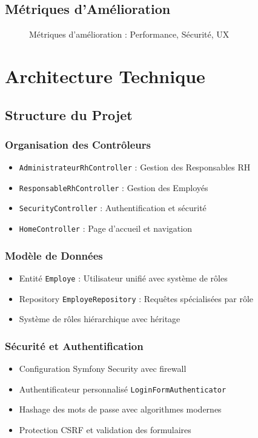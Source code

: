 \documentclass[12pt,a4paper]{article}
\begin{document}
\subsection{Métriques d'Amélioration}

\begin{figure}[H]
    \centering
    \caption{Métriques d'amélioration : Performance, Sécurité, UX}
    \label{fig:metriques_amelioration}
\end{figure}

\section{Architecture Technique}

\subsection{Structure du Projet}

\subsubsection{Organisation des Contrôleurs}
\begin{itemize}
    \item \texttt{AdministrateurRhController} : Gestion des Responsables RH
    \item \texttt{ResponsableRhController} : Gestion des Employés
    \item \texttt{SecurityController} : Authentification et sécurité
    \item \texttt{HomeController} : Page d'accueil et navigation
\end{itemize}

\subsubsection{Modèle de Données}
\begin{itemize}
    \item Entité \texttt{Employe} : Utilisateur unifié avec système de rôles
    \item Repository \texttt{EmployeRepository} : Requêtes spécialisées par rôle
    \item Système de rôles hiérarchique avec héritage
\end{itemize}

\subsubsection{Sécurité et Authentification}
\begin{itemize}
    \item Configuration Symfony Security avec firewall
    \item Authentificateur personnalisé \texttt{LoginFormAuthenticator}
    \item Hashage des mots de passe avec algorithmes modernes
    \item Protection CSRF et validation des formulaires
\end{itemize}
\end{document}
